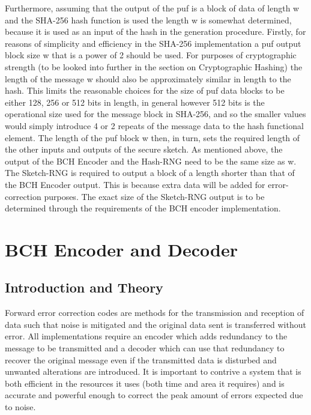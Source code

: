 Furthermore, assuming that the output of the \gls{puf} is a block of data of length
w and the SHA-256 hash function is used the length w is somewhat determined,
because it is used as an input of the hash in the generation procedure.
Firstly, for reasons of simplicity and efficiency in the SHA-256 implementation
a \gls{puf} output block size w that is a power of 2 should be used.
For purposes of cryptographic strength (to be looked into further in the section
on Cryptographic Hashing) the length of the message w should also be
approximately similar in length to the hash. This limits the reasonable choices
for the size of \gls{puf} data blocks to be either 128, 256 or 512 bits in length, in
general however 512 bits is the operational size used for the message block in
SHA-256, and so the smaller values would simply introduce 4 or 2 repeats of the
message data to the hash functional element.
The length of the \gls{puf} block w then, in turn, sets the required length of the
other inputs and outputs of the secure sketch. As mentioned above, the output of
the BCH Encoder and the Hash-RNG need to be the same size as w.
The Sketch-RNG is required to output a block of a length shorter than that of
the BCH Encoder output.
This is because extra data will be added for error-correction purposes.
The exact size of the Sketch-RNG output is to be determined through the
requirements of the BCH encoder implementation.

\section{BCH Encoder and Decoder}

\subsection{Introduction and Theory}

Forward error correction codes are methods for the transmission and reception
of data such that noise is mitigated and the original data sent is transferred
without error.
All implementations require an encoder which adds redundancy to the message to
be transmitted and a decoder which can use that redundancy to recover the
original message even if the transmitted data is disturbed and unwanted
alterations are introduced.
It is important to contrive a system that is both efficient in the resources it
uses (both time and area it requires) and is accurate and powerful enough to
correct the peak amount of errors expected due to noise.

